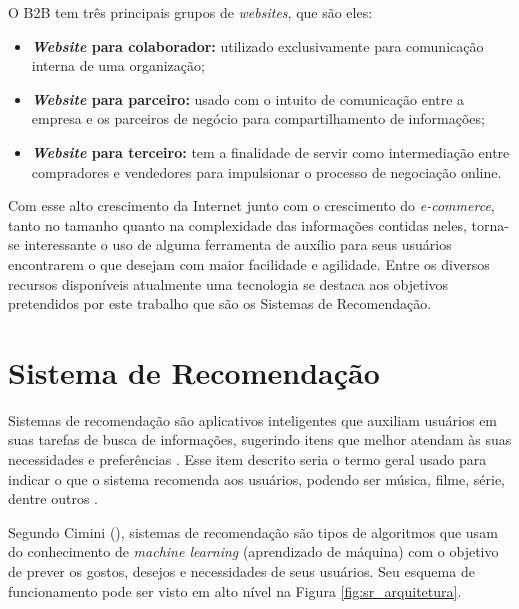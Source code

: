 O B2B tem três principais grupos de \textit{websites}, que são eles:
\begin{itemize}
    \item \textbf{\textit{Website} para colaborador:} utilizado exclusivamente para comunicação interna de uma organização;
    
    \item \textbf{\textit{Website} para parceiro:} usado com o intuito de comunicação entre a empresa e os parceiros de negócio para compartilhamento de informações;
    
    \item \textbf{\textit{Website} para terceiro:} tem a finalidade de servir como intermediação entre compradores e vendedores para impulsionar o processo de negociação online.
    
\end{itemize}

Com esse alto crescimento da Internet junto com o crescimento do \textit{e-commerce}, tanto no tamanho quanto na complexidade das informações contidas neles, torna-se interessante o uso de alguma ferramenta de auxílio para seus usuários encontrarem o que desejam com maior facilidade e agilidade. Entre os diversos recursos disponíveis atualmente uma tecnologia se destaca aos objetivos pretendidos por este trabalho que são os Sistemas de Recomendação.

\section{Sistema de Recomendação}
\label{SR}

Sistemas de recomendação são aplicativos inteligentes que auxiliam usuários em suas tarefas de busca de informações, sugerindo itens que melhor atendam às suas necessidades e preferências \cite{Mahmood:2009:IRS:1557914.1557930}. Esse item descrito seria o termo geral usado para indicar o que o sistema recomenda aos usuários, podendo ser música, filme, série, dentre outros \cite{Ricci:2010}.

Segundo Cimini (\citeyear{Cimini:2019}), sistemas de recomendação são tipos de algoritmos que usam do conhecimento de \textit{machine learning} (aprendizado de máquina) com o objetivo de prever os gostos, desejos e necessidades de seus usuários. Seu esquema de funcionamento pode ser visto em alto nível na Figura \ref{fig:sr_arquitetura}.


